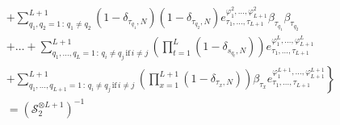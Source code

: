 \documentclass[10pt]{article}
\numberwithin{equation}{section}
\numberwithin{equation}{subsection}
\begin{document}
\begin{align*}
    	\\&+\left. \sum_{q_{1},q_{2}=1\,:\,q_{1}\neq q_{2}}^{L+1}(1-\delta_{\tau_{q_{1}},N})(1-\delta_{\tau_{q_{2}},N})e_{\tau_{1},\ldots,\tau_{L+1}}^{\varphi_{1}^{2},\ldots,\varphi_{L+1}^{2}}\beta_{\tau_{q_{1}}}\beta_{\tau_{q_{2}}}\right.
    	\\&+\left.
    	\ldots+	\sum_{q_{1},\ldots,q_{L}=1\,:\,q_{i}\neq q_{j}\,\text{if}\,i\neq j}^{L+1}\left(\prod_{t=1}^{L}(1-\delta_{s_{q_{t}},N})\right)e_{\tau_{1},\ldots,\tau_{L+1}}^{\varphi_{1}^{L},\ldots,\varphi_{L+1}^{L}}
    	\right. \\&+ \left. 
    	\sum_{q_{1},\ldots,q_{L+1}=1\,:\,q_{i}\neq q_{j}\,\text{if}\,i\neq j}^{L+1}\left(\prod_{x=1}^{L+1}(1-\delta_{\tau_{x},N})\right)\beta_{\tau_{x}}e_{\tau_{1},\ldots,\tau_{L+1}}^{\varphi_{1}^{L+1},\ldots,\varphi_{L+1}^{L+1}} \right\}
    	\\&=
    	\left(\mathcal{S}_{2}^{\otimes L+1}\right)^{-1}
\end{align*}
\end{document}
